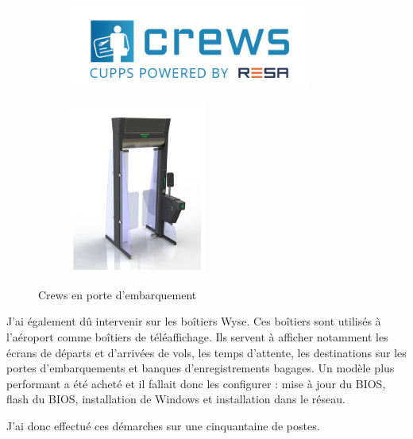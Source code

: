 \begin{figure}[hbt!]
  \begin{subfigure}{0.5\textwidth}
    \centering
    \includegraphics[width=8cm]{Images/logocrews.png}  
    \label{fig:logocrews}
  \end{subfigure}
  \begin{subfigure}{0.5\textwidth}
    \centering
    \includegraphics[width=4.5cm]{Images/crews2.png}\newline  
    \label{fig:portecrews}
  \end{subfigure}
  \caption{Crews en porte d'embarquement}
\end{figure}


J’ai également dû intervenir sur les boîtiers Wyse. Ces boîtiers sont utilisés à l’aéroport comme boîtiers de téléaffichage. Ils servent à afficher notamment les écrans de départs et d’arrivées de vols, les temps d’attente, les destinations sur les portes d’embarquements et banques d'enregistrements bagages. Un modèle plus performant a été acheté et il fallait donc les configurer : mise à jour du BIOS, flash du BIOS, installation de Windows et installation dans le réseau.


J’ai donc effectué ces démarches sur une cinquantaine de postes.\newline

